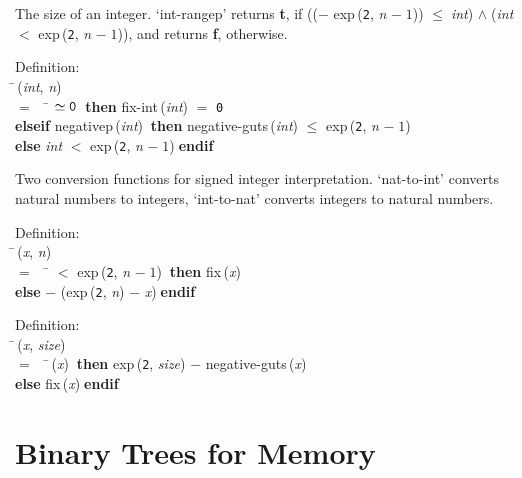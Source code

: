  The size of an integer.
 `int-rangep' returns {\bf{t}}, if (($-$ {\rm{exp}}\,({\tt{2}}, {\it{n\/}} $-\;1$)) $\leq$$\;${\it{int\/}}) $\wedge$$\;$({\it{int\/}} $<$ {\rm{exp}}\,({\tt{2}}, {\it{n\/}} $-\;1$)), and returns {\bf{f}}, otherwise.
\begin{tabbing}{\sc Definition}: \\  
\=\,({\it{int\/}}, {\it{n\/}}) \\ 
$=$$\;\;\;\;$\= $\simeq {\tt{0}}$$\;\;${\bf then }{\rm{fix-int}}\,({\it{int\/}}) $=$ {\tt{0}} \\ 
{\bf elseif }{\rm{negativep}}\,({\it{int\/}})$\;\;${\bf then }{\rm{negative-guts}}\,({\it{int\/}}) $\leq$ {\rm{exp}}\,({\tt{2}}, {\it{n\/}} $-\;1$) \\ 
{\bf else }{\it{int\/}} $<$ {\rm{exp}}\,({\tt{2}}, {\it{n\/}} $-\;1$)$\;${\bf  endif}\-\-
\end{tabbing}

 Two conversion functions for signed integer interpretation. `nat-to-int' 
 converts natural numbers to integers, `int-to-nat' converts integers to 
 natural numbers.
\begin{tabbing}{\sc Definition}: \\  
\=\,({\it{x\/}}, {\it{n\/}}) \\ 
$=$$\;\;\;\;$\= $<$ {\rm{exp}}\,({\tt{2}}, {\it{n\/}} $-\;1$)$\;\;${\bf then }{\rm{fix}}\,({\it{x\/}}) \\ 
{\bf else }$-$ ({\rm{exp}}\,({\tt{2}}, {\it{n\/}}) $-$ {\it{x\/}})$\;${\bf  endif}\-\-
\end{tabbing}

\begin{tabbing}{\sc Definition}: \\  
\=\,({\it{x\/}}, {\it{size\/}}) \\ 
$=$$\;\;\;\;$\=\,({\it{x\/}})$\;\;${\bf then }{\rm{exp}}\,({\tt{2}}, {\it{size\/}}) $-$ {\rm{negative-guts}}\,({\it{x\/}}) \\ 
{\bf else }{\rm{fix}}\,({\it{x\/}})$\;${\bf  endif}\-\-
\end{tabbing}

  \section{Binary Trees for Memory}

